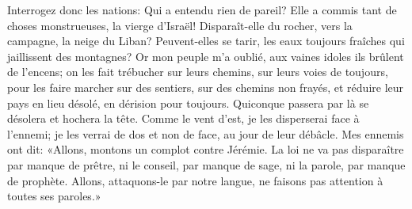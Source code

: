 Interrogez donc les nations: Qui a entendu rien de pareil?
	Elle a commis tant de choses monstrueuses, la vierge d’Israël!
Disparaît-elle du rocher, vers la campagne, la neige du Liban?
	Peuvent-elles se tarir,
	les eaux toujours fraîches qui jaillissent des montagnes?
Or mon peuple m’a oublié, aux vaines idoles ils brûlent de l’encens;
	on les fait trébucher sur leurs chemins, sur leurs voies de toujours,
	pour les faire marcher sur des sentiers, sur des chemins non frayés,
	et réduire leur pays en lieu désolé, en dérision pour toujours.
Quiconque passera par là se désolera et hochera la tête.
Comme le vent d’est, je les disperserai face à l’ennemi;
	je les verrai de dos et non de face, au jour de leur débâcle.
Mes ennemis ont dit:
	«Allons, montons un complot contre Jérémie.
	La loi ne va pas disparaître par manque de prêtre,
	ni le conseil, par manque de sage, ni la parole, par manque de prophète.
Allons, attaquons-le par notre langue,
	ne faisons pas attention à toutes ses paroles.»
